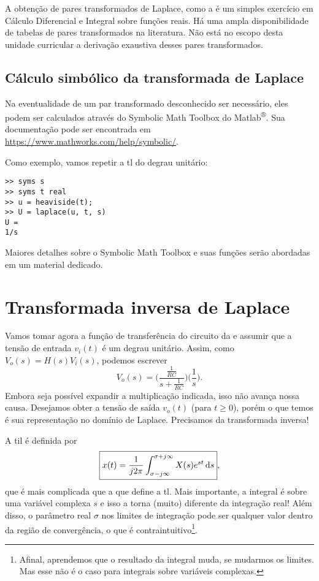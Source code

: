 A obtenção de pares transformados de Laplace, como a  é um simples exercício em Cálculo Diferencial e Integral sobre funções reais. Há uma ampla disponibilidade de tabelas de pares transformados na literatura. Não está no escopo desta unidade curricular a derivação exaustiva desses pares transformados.

\subsection{Cálculo simbólico da transformada de Laplace}

Na eventualidade de um par transformado desconhecido ser necessário, eles podem ser calculados através do Symbolic Math Toolbox do Matlab\textsuperscript{®}. Sua documentação pode ser encontrada em \url{https://www.mathworks.com/help/symbolic/}.

Como exemplo, vamos repetir a \ac{tl} do degrau unitário:
\begin{lstlisting}
>> syms s
>> syms t real
>> u = heaviside(t);
>> U = laplace(u, t, s)
U = 
1/s
\end{lstlisting}

Maiores detalhes sobre o Symbolic Math Toolbox e suas funções serão abordadas em um material dedicado.

\section{Transformada inversa de Laplace}

Vamos tomar agora a função de transferência do circuito da  e assumir que a tensão de entrada $v_i(t)$ é um degrau unitário. Assim, como $V_o(s)=H(s)V_i(s)$, podemos escrever
\begin{equation*}
	V_o(s)=\Big(\frac{\frac{1}{RC}}{s+\frac{1}{RC}}\Big)\Big(\frac{1}{s}\Big).
\end{equation*}
Embora seja possível expandir a multiplicação indicada, isso não avança nossa causa. Desejamos obter a tensão de saída $v_o(t)$ (para $t\geq0$), porém o que temos é sua representação no domínio de Laplace. Precisamos da transformada inversa!

A \ac{til} é definida por
\begin{equation}\label{eq:til}
	\boxed{x(t)=\frac{1}{j2\pi}\inte{X(s)e^{st}}{s}{\sigma-j\infty}{\sigma+j\infty}},
\end{equation}
que é mais complicada que a  que define a \ac{tl}. Mais importante, a integral é sobre uma variável complexa $s$ e isso a torna (muito) diferente da integração real! Além disso, o parâmetro real $\sigma$ nos limites de integração pode ser qualquer valor dentro da região de convergência, o que é contraintuitivo\footnote{Afinal, aprendemos que o resultado da integral muda, se mudarmos os limites. Mas esse não é o caso para integrais sobre variáveis complexas.}.

